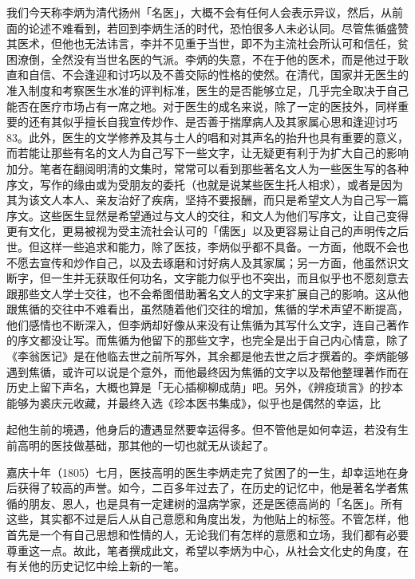 我们今天称李炳为清代扬州「名医」，大概不会有任何人会表示异议，然后，从前面的论述不难看到，若回到李炳生活的时代，恐怕很多人未必认同。尽管焦循盛赞其医术，但他也无法讳言，李并不见重于当世，即不为主流社会所认可和信任，贫困潦倒，全然没有当世名医的气派。李炳的失意，不在于他的医术，而是他过于耿直和自信、不会逢迎和讨巧以及不善交际的性格的使然。在清代，国家并无医生的准入制度和考察医生水准的评判标准，医生的是否能够立足，几乎完全取决于自己能否在医疗市场占有一席之地。对于医生的成名来说，除了一定的医技外，同样重要的还有其似乎擅长自我宣传炒作、是否善于揣摩病人及其家属心思和逢迎讨巧83。此外，医生的文学修养及其与士人的唱和对其声名的抬升也具有重要的意义，而若能让那些有名的文人为自己写下一些文字，让无疑更有利于为扩大自己的影响加分。笔者在翻阅明清的文集时，常常可以看到那些著名文人为一些医生写的各种序文，写作的缘由或为受朋友的委托（也就是说某些医生托人相求），或者是因为其为该文人本人、亲友治好了疾病，坚持不要报酬，而只是希望文人为自己写一篇序文。这些医生显然是希望通过与文人的交往，和文人为他们写序文，让自己变得更有文化，更易被视为受主流社会认可的「儒医」以及更容易让自己的声明传之后世。但这样一些追求和能力，除了医技，李炳似乎都不具备。一方面，他既不会也不愿去宣传和炒作自己，以及去琢磨和讨好病人及其家属；另一方面，他虽然识文断字，但一生并无获取任何功名，文字能力似乎也不突出，而且似乎也不愿刻意去跟那些文人学士交往，也不会希图借助著名文人的文字来扩展自己的影响。这从他跟焦循的交往中不难看出，虽然随着他们交往的增加，焦循的学术声望不断提高，他们感情也不断深入，但李炳却好像从来没有让焦循为其写什么文字，连自己著作的序文都没让写。而焦循为他留下的那些文字，也完全是出于自己内心情意，除了《李翁医记》是在他临去世之前所写外，其余都是他去世之后才撰着的。李炳能够遇到焦循，或许可以说是个意外，而他最终因为焦循的文字以及帮他整理著作而在历史上留下声名，大概也算是「无心插柳柳成荫」吧。另外，《辨疫琐言》的抄本能够为裘庆元收藏，并最终入选《珍本医书集成》，似乎也是偶然的幸运，比

\vfill
\begin{BookNotes}
\end{BookNotes}

\noindent 起他生前的境遇，他身后的遭遇显然要幸运得多。但不管他是如何幸运，若没有生前高明的医技做基础，那其他的一切也就无从谈起了。

嘉庆十年（1805）七月，医技高明的医生李炳走完了贫困了的一生，却幸运地在身后获得了较高的声誉。如今，二百多年过去了，在历史的记忆中，他是著名学者焦循的朋友、恩人，也是具有一定建树的温病学家，还是医德高尚的「名医」。所有这些，其实都不过是后人从自己意愿和角度出发，为他贴上的标签。不管怎样，他首先是一个有自己思想和性情的人，无论我们有怎样的意愿和立场，我们都有必要尊重这一点。故此，笔者撰成此文，希望以李炳为中心，从社会文化史的角度，在有关他的历史记忆中绘上新的一笔。


